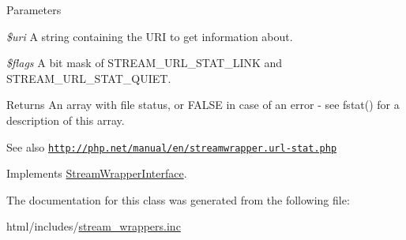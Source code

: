 \begin{DoxyParams}{Parameters}
\item[{\em \$uri}]A string containing the URI to get information about. \item[{\em \$flags}]A bit mask of STREAM\_\-URL\_\-STAT\_\-LINK and STREAM\_\-URL\_\-STAT\_\-QUIET.\end{DoxyParams}
\begin{DoxyReturn}{Returns}
An array with file status, or FALSE in case of an error -\/ see fstat() for a description of this array.
\end{DoxyReturn}
\begin{DoxySeeAlso}{See also}
\href{http://php.net/manual/en/streamwrapper.url-stat.php}{\tt http://php.net/manual/en/streamwrapper.url-\/stat.php} 
\end{DoxySeeAlso}


Implements \hyperlink{interfaceStreamWrapperInterface}{StreamWrapperInterface}.

The documentation for this class was generated from the following file:\begin{DoxyCompactItemize}
\item 
html/includes/\hyperlink{stream__wrappers_8inc}{stream\_\-wrappers.inc}\end{DoxyCompactItemize}
